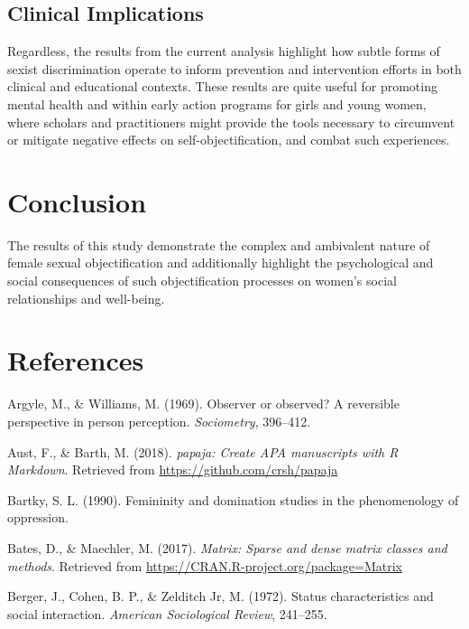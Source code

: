 \documentclass[man]{apa6}
\begin{document}
\subsection{Clinical Implications}\label{clinical-implications}

Regardless, the results from the current analysis highlight how subtle
forms of sexist discrimination operate to inform prevention and
intervention efforts in both clinical and educational contexts. These
results are quite useful for promoting mental health and within early
action programs for girls and young women, where scholars and
practitioners might provide the tools necessary to circumvent or
mitigate negative effects on self-objectification, and combat such
experiences.

\section{Conclusion}\label{conclusion}

The results of this study demonstrate the complex and ambivalent nature
of female sexual objectification and additionally highlight the
psychological and social consequences of such objectification processes
on women's social relationships and well-being.

\section{References}\label{references}

\newpage

\begingroup
\setlength{\parindent}{-0.5in} \setlength{\leftskip}{0.5in}

\hypertarget{refs}{}
\hypertarget{ref-argyle1969}{}
Argyle, M., \& Williams, M. (1969). Observer or observed? A reversible
perspective in person perception. \emph{Sociometry}, 396--412.

\hypertarget{ref-R-papaja}{}
Aust, F., \& Barth, M. (2018). \emph{papaja: Create APA manuscripts with
R Markdown}. Retrieved from \url{https://github.com/crsh/papaja}

\hypertarget{ref-Bartky}{}
Bartky, S. L. (1990). Femininity and domination studies in the
phenomenology of oppression.

\hypertarget{ref-R-Matrix}{}
Bates, D., \& Maechler, M. (2017). \emph{Matrix: Sparse and dense matrix
classes and methods}. Retrieved from
\url{https://CRAN.R-project.org/package=Matrix}

\hypertarget{ref-berger1972}{}
Berger, J., Cohen, B. P., \& Zelditch Jr, M. (1972). Status
characteristics and social interaction. \emph{American Sociological
Review}, 241--255.
\end{document}
